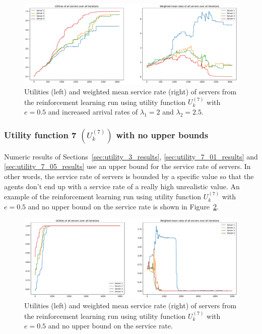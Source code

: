 \begin{figure}[H]
    \includegraphics[width=\textwidth]{chapters/06_agent_based_extension/Bin/reinforcement_learning_results/utility_7/u7_4_e05_Lambda_45.pdf}
    \caption{Utilities (left) and weighted mean service rate (right) of servers
    from the reinforcement learning run using utility function \(U_k^{(7)}\)
    with \(e = 0.5\) and increased arrival rates of \(\lambda_1 = 2\) and
    \(\lambda_2 = 2.5\).}
    \label{fig:RL_utility7_4_e05_Lambda_45}
\end{figure}


\subsubsection{Utility function 7 \((U_k^{(7)})\) with no upper bounds}
\label{sec:utility_7_no_upper_bound_results}

Numeric results of Sections~\ref{sec:utility_3_results},
\ref{sec:utility_7_01_results} and \ref{sec:utility_7_05_results} use an upper
bound for the service rate of servers.
In other words, the service rate of servers is bounded by a specific value
so that the agents don't end up with a service rate of a really high
unrealistic value.
An example of the reinforcement learning run using utility function
\(U_k^{(7)}\) with \(e = 0.5\) and no upper bound on the service rate is
shown in Figure~\ref{fig:RL_utility7_5_no_max_e05}.

\begin{figure}[H]
    \includegraphics[width=\textwidth]{chapters/06_agent_based_extension/Bin/reinforcement_learning_results/utility_7/u7_5_no_max_e05.pdf}
    \caption{Utilities (left) and weighted mean service rate (right) of servers
    from the reinforcement learning run using utility function \(U_k^{(7)}\)
    with \(e = 0.5\) and no upper bound on the service rate.}
    \label{fig:RL_utility7_5_no_max_e05}
\end{figure}

